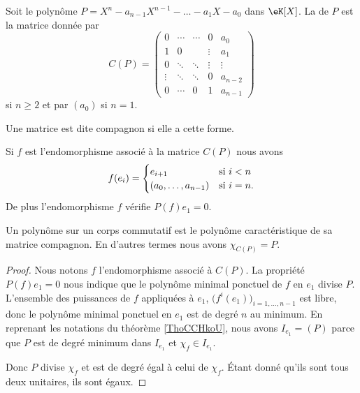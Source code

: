 \begin{definition}      \label{DEFooOSVAooGevsda}
    Soit le polynôme \( P=X^n-a_{n-1}X^{n-1}-\ldots-a_1X-a_0\) dans \( \eK[X]\). La  de \( P\) est la matrice donnée par
    \begin{equation}
        C(P)=\begin{pmatrix}
            0    &   \cdots    &   \cdots    &   0    &   a_0\\  
            1    &   0    &       &   \vdots    &   a_1\\  
            0    &   \ddots    &   \ddots    &   \vdots    &   \vdots\\  
            \vdots    &   \ddots    &   \ddots    &   0    &   a_{n-2}\\  
            0    &   \cdots    &   0    &   1    &   a_{n-1}    
        \end{pmatrix}
    \end{equation}
    si \( n\geq 2\) et par \( (a_0)\) si \( n=1\). 

    Une matrice est dite compagnon si elle a cette forme.
\end{definition}

\begin{proposition}
    Si \( f\) est l'endomorphisme associé à la matrice \( C(P)\) nous avons
    \begin{equation}
        f(e_i)=\begin{cases}
            e_{i+1}    &   \text{si \( i<n\)}\\
            (a_0,\ldots, a_{n-1})    &    \text{si \( i=n\)}.
        \end{cases}
    \end{equation}
    De plus l'endomorphisme \( f\) vérifie \( P(f)e_1=0\).
\end{proposition}

\begin{lemma} \label{LemkVNisk}
    Un polynôme sur un corps commutatif est le polynôme caractéristique de sa matrice compagnon. En d'autres termes nous avons \( \chi_{C(P)}=P\).
\end{lemma}

\begin{proof}
    Nous notons \( f\) l'endomorphisme associé à \( C(P)\). La propriété \( P(f)e_1=0\) nous indique que le polynôme minimal ponctuel de \( f\) en \( e_1\) divise \( P\). L'ensemble des puissances de \( f\) appliquées à \( e_1\), \( \big( f^i(e_1) \big)_{i=1,\ldots, n-1}\) est libre, donc le polynôme minimal ponctuel en \( e_1\) est de degré \( n\) au minimum. En reprenant les notations du théorème \ref{ThoCCHkoU}, nous avons \( I_{e_1}=(P)\) parce que \( P\) est de degré minimum dans \( I_{e_1}\) et \( \chi_f\in I_{e_1}\).

    Donc \( P\) divise \( \chi_f\) et est de degré égal à celui de \( \chi_f\). Étant donné qu'ils sont tous deux unitaires, ils sont égaux.
\end{proof}

